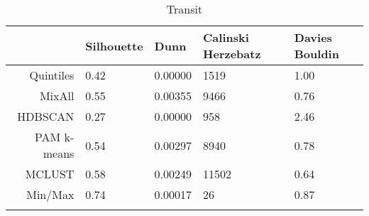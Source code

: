 \documentclass[10pt, a4paper]{article}
\begin{document}
 \pagebreak 
 
\begin{longtable}{rllll}
  \hline
 & Silhouette & Dunn & Calinski Herzebatz & Davies Bouldin \\ 
  \hline
Quintiles & 0.42 & 0.00000 &  1519 & 1.00 \\ 
   \hline
MixAll & 0.55 & 0.00355 &  9466 & 0.76 \\ 
   \hline
HDBSCAN & 0.27 & 0.00000 &   958 & 2.46 \\ 
   \hline
PAM k-means & 0.54 & 0.00297 &  8940 & 0.78 \\ 
   \hline
MCLUST & 0.58 & 0.00249 & 11502 & 0.64 \\ 
   \hline
Min/Max & 0.74 & 0.00017 &    26 & 0.87 \\ 
   \hline
\hline
\caption{Transit} 
\end{longtable}





 \pagebreak 
 




 
\end{document}
